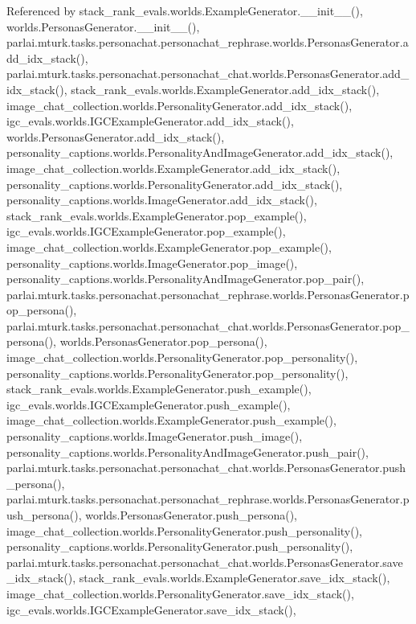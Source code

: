 Referenced by stack\+\_\+rank\+\_\+evals.\+worlds.\+Example\+Generator.\+\_\+\+\_\+init\+\_\+\+\_\+(), worlds.\+Personas\+Generator.\+\_\+\+\_\+init\+\_\+\+\_\+(), parlai.\+mturk.\+tasks.\+personachat.\+personachat\+\_\+rephrase.\+worlds.\+Personas\+Generator.\+add\+\_\+idx\+\_\+stack(), parlai.\+mturk.\+tasks.\+personachat.\+personachat\+\_\+chat.\+worlds.\+Personas\+Generator.\+add\+\_\+idx\+\_\+stack(), stack\+\_\+rank\+\_\+evals.\+worlds.\+Example\+Generator.\+add\+\_\+idx\+\_\+stack(), image\+\_\+chat\+\_\+collection.\+worlds.\+Personality\+Generator.\+add\+\_\+idx\+\_\+stack(), igc\+\_\+evals.\+worlds.\+I\+G\+C\+Example\+Generator.\+add\+\_\+idx\+\_\+stack(), worlds.\+Personas\+Generator.\+add\+\_\+idx\+\_\+stack(), personality\+\_\+captions.\+worlds.\+Personality\+And\+Image\+Generator.\+add\+\_\+idx\+\_\+stack(), image\+\_\+chat\+\_\+collection.\+worlds.\+Example\+Generator.\+add\+\_\+idx\+\_\+stack(), personality\+\_\+captions.\+worlds.\+Personality\+Generator.\+add\+\_\+idx\+\_\+stack(), personality\+\_\+captions.\+worlds.\+Image\+Generator.\+add\+\_\+idx\+\_\+stack(), stack\+\_\+rank\+\_\+evals.\+worlds.\+Example\+Generator.\+pop\+\_\+example(), igc\+\_\+evals.\+worlds.\+I\+G\+C\+Example\+Generator.\+pop\+\_\+example(), image\+\_\+chat\+\_\+collection.\+worlds.\+Example\+Generator.\+pop\+\_\+example(), personality\+\_\+captions.\+worlds.\+Image\+Generator.\+pop\+\_\+image(), personality\+\_\+captions.\+worlds.\+Personality\+And\+Image\+Generator.\+pop\+\_\+pair(), parlai.\+mturk.\+tasks.\+personachat.\+personachat\+\_\+rephrase.\+worlds.\+Personas\+Generator.\+pop\+\_\+persona(), parlai.\+mturk.\+tasks.\+personachat.\+personachat\+\_\+chat.\+worlds.\+Personas\+Generator.\+pop\+\_\+persona(), worlds.\+Personas\+Generator.\+pop\+\_\+persona(), image\+\_\+chat\+\_\+collection.\+worlds.\+Personality\+Generator.\+pop\+\_\+personality(), personality\+\_\+captions.\+worlds.\+Personality\+Generator.\+pop\+\_\+personality(), stack\+\_\+rank\+\_\+evals.\+worlds.\+Example\+Generator.\+push\+\_\+example(), igc\+\_\+evals.\+worlds.\+I\+G\+C\+Example\+Generator.\+push\+\_\+example(), image\+\_\+chat\+\_\+collection.\+worlds.\+Example\+Generator.\+push\+\_\+example(), personality\+\_\+captions.\+worlds.\+Image\+Generator.\+push\+\_\+image(), personality\+\_\+captions.\+worlds.\+Personality\+And\+Image\+Generator.\+push\+\_\+pair(), parlai.\+mturk.\+tasks.\+personachat.\+personachat\+\_\+chat.\+worlds.\+Personas\+Generator.\+push\+\_\+persona(), parlai.\+mturk.\+tasks.\+personachat.\+personachat\+\_\+rephrase.\+worlds.\+Personas\+Generator.\+push\+\_\+persona(), worlds.\+Personas\+Generator.\+push\+\_\+persona(), image\+\_\+chat\+\_\+collection.\+worlds.\+Personality\+Generator.\+push\+\_\+personality(), personality\+\_\+captions.\+worlds.\+Personality\+Generator.\+push\+\_\+personality(), parlai.\+mturk.\+tasks.\+personachat.\+personachat\+\_\+chat.\+worlds.\+Personas\+Generator.\+save\+\_\+idx\+\_\+stack(), stack\+\_\+rank\+\_\+evals.\+worlds.\+Example\+Generator.\+save\+\_\+idx\+\_\+stack(), image\+\_\+chat\+\_\+collection.\+worlds.\+Personality\+Generator.\+save\+\_\+idx\+\_\+stack(), igc\+\_\+evals.\+worlds.\+I\+G\+C\+Example\+Generator.\+save\+\_\+idx\+\_\+stack(), 